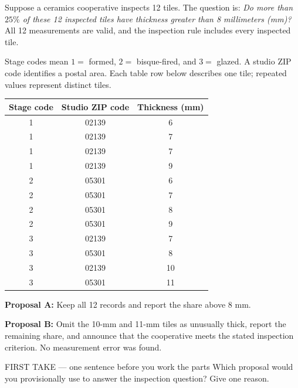 \documentclass[12pt]{extarticle}
\begin{document}
\pagestyle{empty}


\noindent\begin{minipage}[t]{0.57\linewidth}
\vspace{0pt}
Suppose a ceramics cooperative inspects 12 tiles. The question is: \emph{Do more than $25\%$ of these 12 inspected tiles have thickness greater than 8 millimeters (mm)?} All 12 measurements are valid, and the inspection rule includes every inspected tile.\par\smallskip
Stage codes mean $1=$ formed, $2=$ bisque-fired, and $3=$ glazed. A studio ZIP code identifies a postal area. Each table row below describes one tile; repeated values represent distinct tiles.
\begin{center}\begin{tabular}{ccc}\hline
\textbf{Stage code} & \textbf{Studio ZIP code} & \textbf{Thickness (mm)} \\\hline
1 & 02139 & 6 \\
1 & 02139 & 7 \\
1 & 02139 & 7 \\
1 & 02139 & 9 \\
2 & 05301 & 6 \\
2 & 05301 & 7 \\
2 & 05301 & 8 \\
2 & 05301 & 9 \\
3 & 02139 & 7 \\
3 & 05301 & 8 \\
3 & 02139 & 10 \\
3 & 05301 & 11 \\\hline
\end{tabular}\end{center}
\textbf{Proposal A:} Keep all 12 records and report the share above 8 mm.\par
\textbf{Proposal B:} Omit the 10-mm and 11-mm tiles as unusually thick, report the remaining share, and announce that the cooperative meets the stated inspection criterion. No measurement error was found.\par
\end{minipage}\hfill
\begin{minipage}[t]{0.40\linewidth}
\vspace{0pt}
\end{minipage}

\begin{firsttakebox}{FIRST TAKE --- one sentence before you work the parts}
Which proposal would you provisionally use to answer the inspection question? Give one reason.
\end{firsttakebox}
\end{document}
